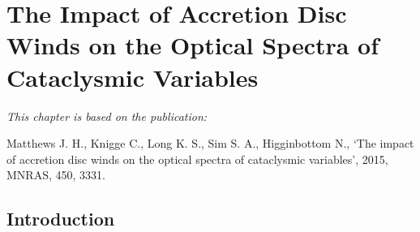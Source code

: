 %
%


\chapter{The Impact of Accretion Disc Winds on the Optical Spectra of Cataclysmic Variables}

{\em This chapter is based on the publication:

Matthews J. H., Knigge C., Long K. S., Sim S. A., Higginbottom N., 
`The impact of accretion disc winds on the optical spectra of 
cataclysmic variables',
2015, MNRAS, 450, 3331.}
%
%

\section{Introduction} 
\label{sec:intro}



